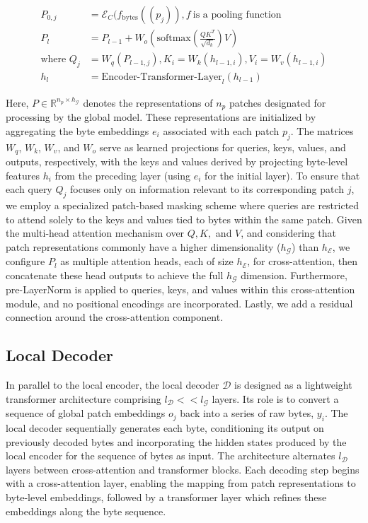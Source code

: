 \begin{align}
P_{0,j} &= \mathcal{E}_{C}(f_\text{bytes}((p_j)), f~ \text{is a pooling function} \\
P_l &= P_{l-1} + W_o\left(\text{softmax}\left(\frac{QK^T}{\sqrt{d_k}}\right)V\right) \\
\text{where } Q_j &= W_q(P_{l-1,j}), K_i = W_k(h_{l-1,i}), V_i = W_v(h_{l-1,i}) \\
h_l &= \text{Encoder-Transformer-Layer}_l(h_{l-1})
\end{align}

Here, $P \in \mathbb{R}^{n_p \times h_{\mathcal{G}}}$ denotes the representations of $n_p$ patches designated for processing by the global model. These representations are initialized by aggregating the byte embeddings $e_i$ associated with each patch $p_j$. The matrices $W_q$, $W_k$, $W_v$, and $W_o$ serve as learned projections for queries, keys, values, and outputs, respectively, with the keys and values derived by projecting byte-level features $h_i$ from the preceding layer (using $e_i$ for the initial layer). To ensure that each query $Q_j$ focuses only on information relevant to its corresponding patch $j$, we employ a specialized patch-based masking scheme where queries are restricted to attend solely to the keys and values tied to bytes within the same patch. Given the multi-head attention mechanism over $Q, K,$ and $V$, and considering that patch representations commonly have a higher dimensionality ($h_{\mathcal{G}}$) than $h_{\mathcal{E}}$, we configure $P_l$ as multiple attention heads, each of size $h_{\mathcal{E}}$, for cross-attention, then concatenate these head outputs to achieve the full $h_{\mathcal{G}}$ dimension. Furthermore, pre-LayerNorm is applied to queries, keys, and values within this cross-attention module, and no positional encodings are incorporated. Lastly, we add a residual connection around the cross-attention component.

\subsection{Local Decoder} 

In parallel to the local encoder, the local decoder $\mathcal{D}$ is designed as a lightweight transformer architecture comprising $l_{\mathcal{D}} << l_{\mathcal{G}}$ layers. Its role is to convert a sequence of global patch embeddings $o_j$ back into a series of raw bytes, $y_i$. The local decoder sequentially generates each byte, conditioning its output on previously decoded bytes and incorporating the hidden states produced by the local encoder for the sequence of bytes as input. The architecture alternates $l_{\mathcal{D}}$ layers between cross-attention and transformer blocks. Each decoding step begins with a cross-attention layer, enabling the mapping from patch representations to byte-level embeddings, followed by a transformer layer which refines these embeddings along the byte sequence.

